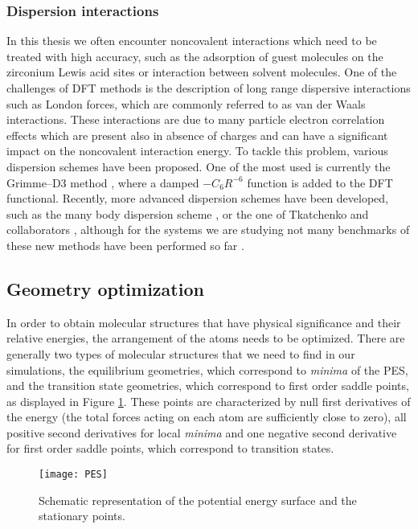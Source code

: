 \subsubsection*{Dispersion interactions}
In this thesis we often encounter noncovalent interactions which need to be treated with high accuracy, such as the adsorption of guest molecules on the zirconium Lewis acid sites or interaction between solvent molecules. One of the challenges of DFT methods is the description of long range dispersive interactions such as London forces, which are commonly referred to as van der Waals interactions. These interactions are due to many particle electron correlation effects which are present also in absence of charges and can have a significant impact on the noncovalent interaction energy. To tackle this problem, various dispersion schemes have been proposed. One of the most used is currently the Grimme--D3 method \cite{Grimme2010}, where a damped $-C_{6}R^{-6}$ function is added to the DFT functional. Recently, more advanced dispersion schemes have been developed, such as the many body dispersion scheme \cite{Buko2016}, or the one of Tkatchenko and collaborators \cite{Ambrosetti2014}, although for the systems we are studying not many benchmarks of these new methods have been performed so far \cite{Wieme2018}.

\subsection*{Geometry optimization}
In order to obtain molecular structures that have physical significance and their relative energies, the arrangement of the atoms needs to be optimized. There are generally two types of molecular structures that we need to find in our simulations, the equilibrium geometries, which correspond to \textit{minima} of the PES, and the transition state geometries, which correspond to first order saddle points, as displayed in Figure \ref{fig:PES}. These points are characterized by null first derivatives of the energy (the total forces acting on each atom are sufficiently close to zero), all positive second derivatives for local \textit{minima} and one negative second derivative for first order saddle points, which correspond to transition states. 

\begin{figure}[!htbp]
	\centering
 	\texttt{[image: PES]}
	\caption{Schematic representation of the potential energy surface and the stationary points.}
	\label{fig:PES}
\end{figure}

